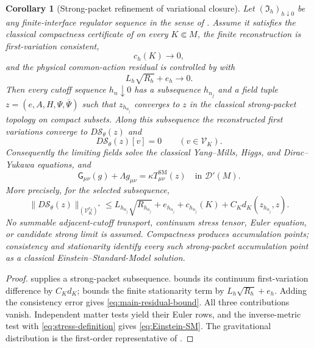 \documentclass[11pt]{article}
\numberwithin{equation}{section}
\newtheorem{corollary}[corollary]{Corollary}
\theoremstyle{definition}
\theoremstyle{remark}
\newcommand{\norm}[1]{\lVert#1\rVert}
\newcommand{\Dtest}{\mathcal D}
\newcommand{\Sact}{\mathscr S}
\newcommand{\Vtest}{\mathscr V}
\newcommand{\Eins}{\mathsf G}
\newcommand{\bPsi}{\overline\Psi}
\newcommand{\Iface}{\mathfrak I}
\begin{document}
\begin{corollary}[Strong-packet refinement of variational closure]
\label{thm:main-limit}
Let $(\Iface_h)_{h\downarrow0}$ be any finite-interface regulator sequence in the sense of . Assume it satisfies the classical compactness certificate of  on every $K\Subset M$, the finite reconstruction is first-variation consistent,
\begin{equation}
 c_h(K)\longrightarrow0,
 \label{eq:main-consistency}
\end{equation}
and the physical common-action residual is controlled by  with
\begin{equation}
 L_h\sqrt{R_h}+e_h\longrightarrow0.
 \label{eq:main-source-vanishing}
\end{equation}
Then every cutoff sequence $h_n\downarrow0$ has a subsequence $h_{n_j}$ and a field tuple $z=(e,A,H,\Psi,\bPsi)$ such that $z_{h_{n_j}}$ converges to $z$ in the classical strong-packet topology on compact subsets. Along this subsequence the reconstructed first variations converge to $D\Sact_\theta(z)$ and
\begin{equation}
 D\Sact_\theta(z)[v]=0\qquad(v\in\Vtest_K).
 \label{eq:main-stationary}
\end{equation}
Consequently the limiting fields solve the classical Yang--Mills, Higgs, and Dirac--Yukawa equations, and
\begin{equation}
 \Eins_{\mu\nu}(g)+\Lambda g_{\mu\nu}
 =\kappa T^{\mathrm{SM}}_{\mu\nu}(z)
 \quad\text{in }\Dtest'(M).
 \label{eq:Einstein-SM}
\end{equation}
More precisely, for the selected subsequence,
\begin{equation}
 \norm{D\Sact_\theta(z)}_{(\Vtest_K^{r_0})^*}
 \le L_{h_{n_j}}\sqrt{R_{h_{n_j}}}+e_{h_{n_j}}
      +c_{h_{n_j}}(K)+C_Kd_K(z_{h_{n_j}},z).
 \label{eq:main-residual-bound}
\end{equation}
No summable adjacent-cutoff transport, continuum stress tensor, Euler equation, or candidate strong limit is assumed. Compactness produces accumulation points; consistency and stationarity identify every such strong-packet accumulation point as a classical Einstein--Standard-Model solution.
\end{corollary}

\begin{proof}
 supplies a strong-packet subsequence.
 bounds its continuum first-variation
difference by $C_Kd_K$;  bounds the finite
stationarity term by $L_h\sqrt{R_h}+e_h$. Adding the consistency error
gives \eqref{eq:main-residual-bound}. All three contributions vanish.
Independent matter tests yield their Euler rows, and the inverse-metric
test with \eqref{eq:stress-definition} gives \eqref{eq:Einstein-SM}.
The gravitational distribution is the first-order representative of
.
\end{proof}
\end{document}
